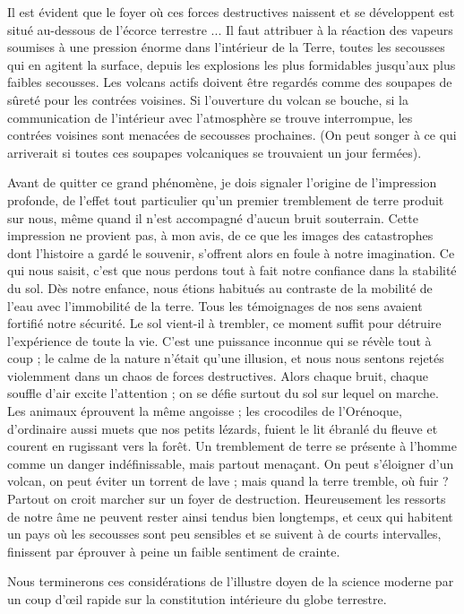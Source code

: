 \documentclass[a4paper, 11pt, oneside, landscape]{article}
\begin{document}
Il est évident que le foyer où ces forces destructives naissent et se développent est situé au-dessous de l'écorce terrestre ... Il faut attribuer à la réaction des vapeurs soumises à une pression énorme dans l'intérieur de la Terre, toutes les secousses qui en agitent la surface, depuis les explosions les plus formidables jusqu'aux plus faibles secousses. Les volcans actifs doivent être regardés comme des soupapes de sûreté pour les contrées voisines. Si l'ouverture du volcan se bouche, si la communication de l'intérieur avec l'atmosphère se trouve interrompue, les contrées voisines sont menacées de secousses prochaines. (On peut songer à ce qui arriverait si toutes ces soupapes volcaniques se trouvaient un jour fermées).

Avant de quitter ce grand phénomène, je dois signaler l'origine de l'impression profonde, de l'effet tout particulier qu'un premier tremblement de terre produit sur nous, même quand il n'est accompagné d'aucun bruit souterrain. Cette impression ne provient pas, à mon avis, de ce que les images des catastrophes dont l'histoire a gardé le souvenir, s'offrent alors en foule à notre imagination. Ce qui nous saisit, c'est que nous perdons tout à fait notre confiance dans la stabilité du sol. Dès notre enfance, nous étions habitués au contraste de la mobilité de l'eau avec l'immobilité de la terre. Tous les témoignages de nos sens avaient fortifié notre sécurité. Le sol vient-il à trembler, ce moment suffit pour détruire l'expérience de toute la vie. C'est une puissance inconnue qui se révèle tout à coup ; le calme de la nature n'était qu'une illusion, et nous nous sentons rejetés violemment dans un chaos de forces destructives. Alors chaque bruit, chaque souffle d'air excite l'attention ; on se défie surtout du sol sur lequel on marche. Les animaux éprouvent la même angoisse ; les crocodiles de l'Orénoque, d'ordinaire aussi muets que nos petits lézards, fuient le lit ébranlé du fleuve et courent en rugissant vers la forêt. Un tremblement de terre se présente à l'homme comme un danger indéfinissable, mais partout menaçant. On peut s'éloigner d'un volcan, on peut éviter un torrent de lave ; mais quand la terre tremble, où fuir ? Partout on croit marcher sur un foyer de destruction. Heureusement les ressorts de notre âme ne peuvent rester ainsi tendus bien longtemps, et ceux qui habitent un pays où les secousses sont peu sensibles et se suivent à de courts intervalles, finissent par éprouver à peine un faible sentiment de crainte.

Nous terminerons ces considérations de l'illustre doyen de la science moderne par un coup d'œil rapide sur la constitution intérieure du globe terrestre.
\end{document}
